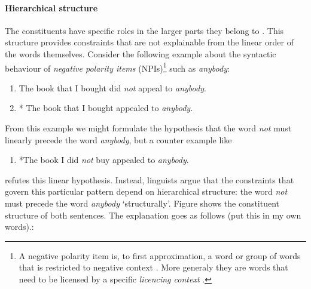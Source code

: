 \paragraph{Hierarchical structure} The constituents have specific roles in the larger parts they belong to \citep{huddleston2002grammar}. This structure provides constraints that are not explainable from the linear order of the words themselves. Consider the following example about the syntactic behaviour of \textit{negative polarity items} (NPIs)\footnote{A negative polarity item is, to first approximation, a word or group of words that is restricted to negative context \citep{Everaert+2015:structures}. More generaly they are words that need to be licensed by a specific \textit{licencing context} \citep{giannakidou2011npi}.} such as \textit{anybody}:
\begin{enumerate}
  \item The book that I bought did \textit{not} appeal to \textit{anybody}.
  \item * The book that I bought appealed to \textit{anybody}.
\end{enumerate}
From this example we might formulate the hypothesis that the word \textit{not} must linearly precede the word \textit{anybody}, but a counter example like
\begin{enumerate}
  \item *The book I did \textit{not} buy appealed to \textit{anybody}.
\end{enumerate}
refutes this linear hypothesis. Instead, linguists argue that the constraints that govern this particular pattern depend on hierarchical structure: the word \textit{not} must precede the word \textit{anybody} `structurally'. Figure \label{ref:trees-npi} shows the constituent structure of both sentences. The explanation goes as follows (put this in my own words).:

% 		  
%
% 		  
%


